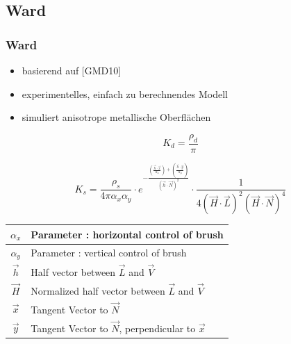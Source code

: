 \documentclass[11pt]{beamer}
\begin{document}
\subsection{Ward}
\begin{frame}[allowframebreaks]
\frametitle{Ward}

\begin{itemize}
\item basierend auf [GMD10]
\item experimentelles, einfach zu berechnendes Modell
\item simuliert anisotrope metallische Oberflächen
\end{itemize}

\begin{equation}
K_d = \frac{\rho_d}{\pi}
\end{equation}

\begin{equation}
K_s = \frac{\rho_s}{4 \pi \alpha_x \alpha_y } 
\cdot e^
{
- \frac{(\frac{\vec{h} \cdot \vec{x}}{\alpha_x})+(\frac{\vec{h} \cdot \vec{y}}{\alpha_y})}
{(\vec{h} \cdot \vec{N})^2}
}
\cdot 
\frac{1}{4 (\vec{H} \cdot \vec{L})^2 (\vec{H} \cdot \vec{N})^4}
\end{equation}


\begin{table}[H]
\begin{tabular}{| c | l |}
\hline
$\alpha_x$ & Parameter : horizontal control of brush\\ \hline
$\alpha_y$ & Parameter : vertical control of brush \\ \hline
$\vec{h}$ & Half vector between $\vec{L}$ and $\vec{V}$ \\ \hline
$\vec{H}$ & Normalized half vector between $\vec{L}$ and $\vec{V}$ \\ \hline
$\vec{x}$ & Tangent Vector to $\vec{N}$ \\ \hline
$\vec{y}$ & Tangent Vector to $\vec{N}$, perpendicular to $\vec{x}$ \\ \hline
\end{tabular}
\end{table}


\end{frame}
\end{document}
